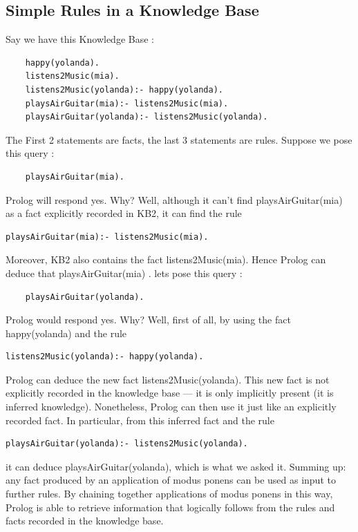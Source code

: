 \documentclass[14pt]{article}
\begin{document}
\subsection{Simple Rules in a Knowledge Base}
Say we have this Knowledge Base :
\begin{verbatim}
	happy(yolanda).
	listens2Music(mia).
	listens2Music(yolanda):- happy(yolanda).
	playsAirGuitar(mia):- listens2Music(mia).
	playsAirGuitar(yolanda):- listens2Music(yolanda).
\end{verbatim}
The First 2 statements are facts, the last 3 statements are 
rules. Suppose we pose this query :
\begin{verbatim}
	playsAirGuitar(mia).
\end{verbatim}
Prolog will respond yes. Why? Well, although it can’t find 
playsAirGuitar(mia) as a fact explicitly recorded in KB2, 
it can find the rule
\begin{verbatim}
playsAirGuitar(mia):- listens2Music(mia).
\end{verbatim}
Moreover, KB2 also contains the fact listens2Music(mia).
Hence Prolog can  deduce that playsAirGuitar(mia) . 
lets pose this query :
\begin{verbatim}
	playsAirGuitar(yolanda).
\end{verbatim}
Prolog would respond yes. Why? Well, first of all,
by using the fact happy(yolanda) and the rule
\begin{verbatim}
listens2Music(yolanda):- happy(yolanda).
\end{verbatim}
Prolog can deduce the new fact listens2Music(yolanda).
This new fact is not explicitly recorded in the knowledge base — it is 
only implicitly present (it is inferred knowledge). Nonetheless,
Prolog can then use it just like an explicitly recorded fact. In
particular, from this inferred fact and the rule
\begin{verbatim}
playsAirGuitar(yolanda):- listens2Music(yolanda).
\end{verbatim}
it can deduce playsAirGuitar(yolanda),
which is what we asked it. Summing up: any fact produced by an 
application of modus ponens can be used as input to further rules.
By chaining together applications of modus ponens in this way,
Prolog is able to retrieve information that logically follows from the
rules and facts recorded in the knowledge base.
\newpage 
\end{document}
